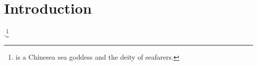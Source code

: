\section{Introduction}
\label{sec:intro}


\Name.\footnote{
    \Name is a Chinesea sea goddess and the deity of seafarers.
}
